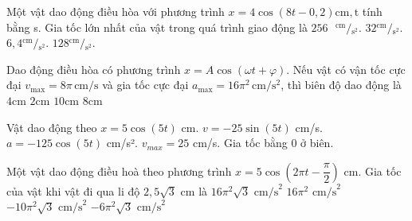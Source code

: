 
\begin{ex}
Một vật dao động điều hòa với phương trình $x=4\cos\left( 8t-0,2 \right)\text{cm},\text{t}$ tính bằng s. Gia tốc lớn nhất của vật trong quá trình giao động là
\choice
{\True $256\text{ }{}^{\text{cm}}/{}_{{{\text{s}}^{2}}}.$}
{$32{}^{\text{cm}}/{}_{{{\text{s}}^{2}}}.$}
{$6,4{}^{\text{cm}}/{}_{{{\text{s}}^{2}}}.$}
{$128{}^{\text{cm}}/{}_{{{\text{s}}^{2}}}.$}
\end{ex}

\begin{ex}
Dao động điều hòa có phương trình $x = A \cos (\omega t + \varphi)$. Nếu vật có vận tốc cực đại $v_{\max} = 8\pi \, \mathrm{cm/s}$ và gia tốc cực đại $a_{\max} = 16\pi^2 \, \mathrm{cm/s^2}$, thì biên độ dao động là
\choice
{\True $4\text{cm}$}
{$2\text{cm}$}
{$10\text{cm}$}
{$8\text{cm}$}
\end{ex}

\begin{ex}
Vật dao động theo $x=5\cos(5t)$ cm.
\choiceTF
{\True $v=-25\sin(5t)$ cm/s.}
{\True $a=-125\cos(5t)$ cm/s².}
{\True $v_{max}=25$ cm/s.}
{Gia tốc bằng 0 ở biên.}
\end{ex}

\begin{ex}
Một vật dao động điều hoà theo phương trình $x=5\cos\left( 2\pi t-\dfrac{\pi}{2} \right)\text{ cm}$. Gia tốc của vật khi vật đi qua li độ $2,5\sqrt{3}\text{ cm}$ là
\choice
{$16\pi^{2}\sqrt{3}\text{ cm/s}^{2}$}
{$16\pi^{2}\text{ cm/s}^{2}$}
{\True $-10\pi^{2}\sqrt{3}\text{ cm/s}^{2}$}
{$-6\pi^{2}\sqrt{3}\text{ cm/s}^{2}$}
\end{ex}

